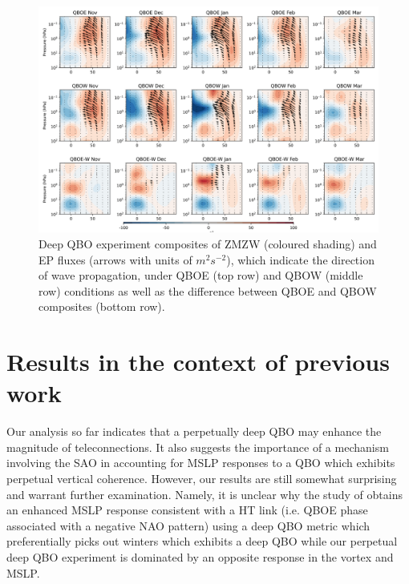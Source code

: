 \begin{figure}[h!]
\begin{center}
\noindent\includegraphics[width = \linewidth]{Figures/Figures-deepQBO/EP_flux_composites_by_month_QBO_phases_d_higher_MarQBO_vs_Mar_30hPa_5thresh.png}
\caption[EP flux composites under different QBO phases in the deep QBO simulation]{Deep QBO experiment composites of ZMZW (coloured shading) and EP fluxes (arrows with units of $m^2s^{-2}$), which indicate the direction of wave propagation, under QBOE (top row) and QBOW (middle row) conditions as well as the difference between QBOE and QBOW composites (bottom row).}
\label{fig:EP_deep}
\end{center}
\end{figure}
\newpage

\section{Results in the context of previous work}
Our analysis so far indicates that a perpetually deep QBO may enhance the magnitude of teleconnections. It also suggests the importance of a mechanism involving the SAO in accounting for MSLP responses to a QBO which exhibits perpetual vertical coherence. However, our results are still somewhat surprising and warrant further examination. Namely, it is unclear why the study of \cite{andrewsObserved2019d} obtains an enhanced MSLP response consistent with a HT link (i.e. QBOE phase associated with a negative NAO pattern) using a deep QBO metric which preferentially picks out winters which exhibits a deep QBO while our perpetual deep QBO experiment is dominated by an opposite response in the vortex and MSLP. 

